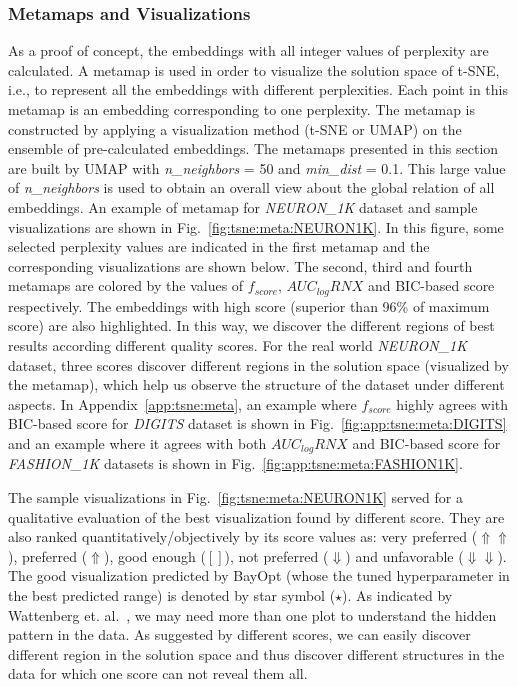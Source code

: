 \subsubsection*{Metamaps and Visualizations}
As a proof of concept, the embeddings with all integer values of perplexity are calculated.
A metamap is used in order to visualize the solution space of t-SNE, i.e., to represent all the embeddings with different perplexities.
Each point in this metamap is an embedding corresponding to one perplexity.
The metamap is constructed by applying a visualization method (t-SNE or UMAP) on the ensemble of pre-calculated embeddings.
The metamaps presented in this section are built by UMAP with \emph{n\_neighbors} = 50 and \emph{min\_dist} = 0.1.
This large value of \emph{n\_neighbors} is used to obtain an overall view about the global relation of all embeddings.
An example of metamap for \emph{NEURON\_1K} dataset and sample visualizations are shown in Fig.~\ref{fig:tsne:meta:NEURON1K}.
In this figure, some selected perplexity values are indicated in the first metamap and the corresponding visualizations are shown below.
The second, third and fourth metamaps are colored by the values of $f_{score}$, $AUC_{log}RNX$ and BIC-based score respectively.
The embeddings with high score (superior than 96\% of maximum score) are also highlighted.
In this way, we discover the different regions of best results according different quality scores.
For the real world \emph{NEURON\_1K} dataset, three scores discover different regions in the solution space (visualized by the metamap), which help us observe the structure of the dataset under different aspects.
In Appendix~\ref{app:tsne:meta}, an example where $f_{score}$ highly agrees with BIC-based score for \emph{DIGITS} dataset is shown in Fig.~\ref{fig:app:tsne:meta:DIGITS}
and an example where it agrees with both $AUC_{log}RNX$ and BIC-based score for \emph{FASHION\_1K} datasets is shown in Fig.~\ref{fig:app:tsne:meta:FASHION1K}.

The sample visualizations in Fig.~\ref{fig:tsne:meta:NEURON1K} served for a qualitative evaluation of the best visualization found by different score.
They are also ranked quantitatively/objectively by its score values as: very preferred ($\Uparrow\Uparrow$), preferred ($\Uparrow$), good enough ($[]$), not preferred ($\Downarrow$) and unfavorable ($\Downarrow\Downarrow$).
The good visualization predicted by BayOpt (whose the tuned hyperparameter in the best predicted range) is denoted by star symbol ($\star$).
As indicated by Wattenberg et. al.~\cite{wattenberg2016use}, we may need more than one plot to understand the hidden pattern in the data.
As suggested by different scores, we can easily discover different region in the solution space and thus discover different structures in the data for which one score can not reveal them all.


